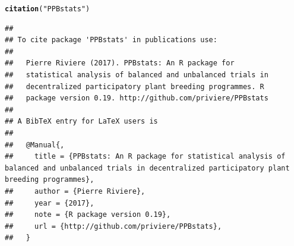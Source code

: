 \documentclass{book}\usepackage[]{graphicx}\usepackage[]{color}
\makeatletter
\newcommand{\hlstr}[1]{\textcolor[rgb]{0.192,0.494,0.8}{#1}}%
\newcommand{\hlstd}[1]{\textcolor[rgb]{0.345,0.345,0.345}{#1}}%
\newcommand{\hlkwd}[1]{\textcolor[rgb]{0.737,0.353,0.396}{\textbf{#1}}}%
\newenvironment{kframe}{%
 \def\at@end@of@kframe{}%
 \ifinner\ifhmode%
  \def\at@end@of@kframe{\end{minipage}}%
  \begin{minipage}{\columnwidth}%
 \fi\fi%
 \def\FrameCommand##1{\hskip\@totalleftmargin \hskip-\fboxsep
 \colorbox{shadecolor}{##1}\hskip-\fboxsep
     \hskip-\linewidth \hskip-\@totalleftmargin \hskip\columnwidth}%
 \MakeFramed {\advance\hsize-\width
   \@totalleftmargin\z@ \linewidth\hsize
   \@setminipage}}%
 {\par\unskip\endMakeFramed%
 \at@end@of@kframe}
\newenvironment{knitrout}{}{} %
\makeatother
\begin{document}
\begin{knitrout}
\color{fgcolor}\begin{kframe}
\begin{alltt}
\hlkwd{citation}\hlstd{(}\hlstr{"PPBstats"}\hlstd{)}
\end{alltt}
\begin{verbatim}
## 
## To cite package 'PPBstats' in publications use:
## 
##   Pierre Riviere (2017). PPBstats: An R package for
##   statistical analysis of balanced and unbalanced trials in
##   decentralized participatory plant breeding programmes. R
##   package version 0.19. http://github.com/priviere/PPBstats
## 
## A BibTeX entry for LaTeX users is
## 
##   @Manual{,
##     title = {PPBstats: An R package for statistical analysis of balanced and unbalanced trials in decentralized participatory plant breeding programmes},
##     author = {Pierre Riviere},
##     year = {2017},
##     note = {R package version 0.19},
##     url = {http://github.com/priviere/PPBstats},
##   }
\end{verbatim}
\end{kframe}
\end{knitrout}


\end{document}
